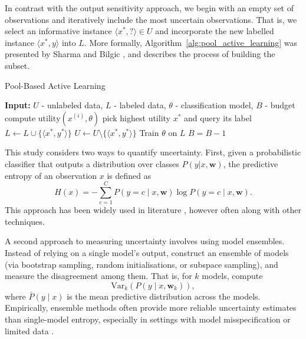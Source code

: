 \documentclass[10pt, conference]{IEEEtran}
\begin{document}
In contrast with the output sensitivity approach, we begin with an empty set of observations and iteratively include the most uncertain observations. That is, we select an informative instance $\langle x^{*}, ? \rangle \in U$ and incorporate the new labelled instance $\langle x^{*}, y \rangle$ into $L$. More formally, Algorithm~\ref{alg:pool_active_learning} was presented by Sharma and Bilgic \cite{alus}, and describes the process of building the subset.


\begin{algorithm}
	\caption{Pool-Based Active Learning}
	\label{alg:pool_active_learning}
	\begin{algorithmic}[1]
		\State \textbf{Input:} $U$ - unlabeled data, $L$ - labeled data, $\theta$ - classification model, $B$ - budget
		\Repeat
		\State compute $\text{utility}(x^{(i)}, \theta)$
		\EndFor
		\State pick highest utility $x^*$ and query its label
		\State $L \leftarrow L \cup \{\langle x^*, y^* \rangle\}$
		\State $U \leftarrow U \setminus \{\langle x^*, y^* \rangle\}$
		\State Train $\theta$ on $L$
		\State $B = B - 1$
	\end{algorithmic}
\end{algorithm}

This study considers two ways to quantify uncertainty. First, given a probabilistic classifier that outputs a distribution over classes $P(y|x, \mathbf{w})$, the predictive entropy of an observation $x$ is defined as
\begin{equation}
H(x) = - \sum_{c=1}^{C} P(y=c \mid x, \mathbf{w}) \log P(y=c \mid x, \mathbf{w}).
\label{eq:entropy}
\end{equation}
This approach has been widely used in literature \cite{e1, e2, e3}, however often along with other techniques.

A second approach to measuring uncertainty involves using model ensembles. Instead of relying on a single model's output, construct an ensemble of models (via bootstrap sampling, random initialisations, or subspace sampling), and measure the disagreement among them. That is, for $k$ models, compute
\begin{equation}
\mathrm{Var}_{k}(P(y \mid x, \mathbf{w}_k)),
\label{eq:var-e}
\end{equation}
where $\bar P(y \mid x)$ is the mean predictive distribution across the models. Empirically, ensemble methods often provide more reliable uncertainty estimates than single-model entropy, especially in settings with model misspecification or limited data \cite{Yin2023_uncertainty_active_learning}.
\end{document}
